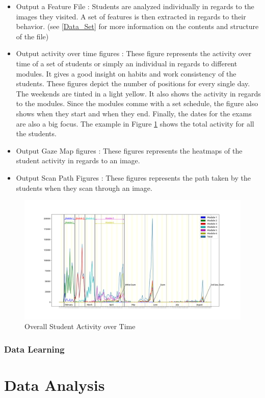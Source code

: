 \documentclass[a4paper,11pt]{report}
\numberwithin{figure}{section} %
\begin{document}
    \begin{itemize}
        \item[\textbullet] Output a Feature File : Students are analyzed individually in regards to the images they visited.
        A set of features is then extracted in regards to their behavior.
        (see \ref{Data_Set} for more information on the contents and structure of the file)
        \item[\textbullet] Output activity over time figures : These figure represents the activity over time of a set of students or simply an individual in regards to different modules.
        It gives a good insight on habits and work consistency of the students.
        These figures depict the number of positions for every single day.
        The weekends are tinted in a light yellow.
        It also shows the activity in regards to the modules.
        Since the modules comme with a set schedule, the figure also shows when they start and when they end.
        Finally, the dates for the exams are also a big focus.
        The example in Figure \ref{fig:timelapse} shows the total activity for all the students.
        \item[\textbullet] Output Gaze Map figures : These figures represents the heatmaps of the student activity in regards to an image.
        \item[\textbullet] Output Scan Path Figures : These figures represents the path taken by the students when they scan through an image.
    \end{itemize}
    \begin{figure}[H]
      \centering
      \includegraphics[width=.45\linewidth]{timelapse.png}
      \caption{Overall Student Activity over Time}
      \label{fig:timelapse}
    \end{figure}


    \subsubsection{Data Learning}


\section{Data Analysis}
\end{document}
